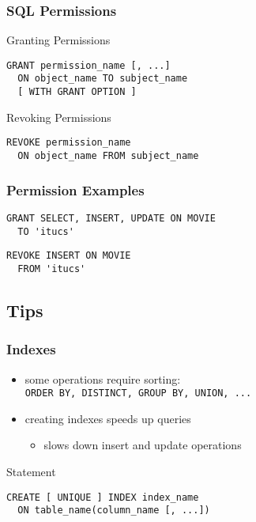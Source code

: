 \documentclass[dvipsnames]{beamer}
\theoremstyle{plain}
\begin{document}
\begin{frame}[fragile]
  \frametitle{SQL Permissions}

  \begin{block}{Granting Permissions}
    \begin{lstlisting}
GRANT permission_name [, ...]
  ON object_name TO subject_name
  [ WITH GRANT OPTION ]
    \end{lstlisting}
  \end{block}

  \pause
  \begin{block}{Revoking Permissions}
    \begin{lstlisting}
REVOKE permission_name
  ON object_name FROM subject_name
    \end{lstlisting}
  \end{block}
\end{frame}

\begin{frame}[fragile]
  \frametitle{Permission Examples}

  \begin{example}
    \begin{lstlisting}
GRANT SELECT, INSERT, UPDATE ON MOVIE
  TO 'itucs'
    \end{lstlisting}
  \end{example}

  \pause
  \begin{example}
    \begin{lstlisting}
REVOKE INSERT ON MOVIE
  FROM 'itucs'
    \end{lstlisting}
  \end{example}
\end{frame}

\subsection{Tips}

\begin{frame}[fragile]
  \frametitle{Indexes}

  \begin{itemize}
    \item some operations require sorting:\\
      \lstinline!ORDER BY, DISTINCT, GROUP BY, UNION, ...!

    \pause
    \item creating indexes speeds up queries
    \begin{itemize}
      \item slows down insert and update operations
    \end{itemize}
  \end{itemize}

  \pause
  \begin{block}{Statement}
    \begin{lstlisting}
CREATE [ UNIQUE ] INDEX index_name
  ON table_name(column_name [, ...])
    \end{lstlisting}
  \end{block}
\end{frame}
\end{document}
